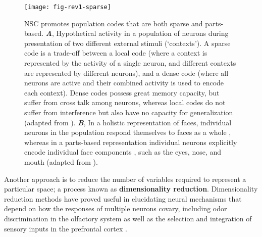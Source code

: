 \begin{figure}[h]
	\centering
	\texttt{[image: fig-rev1-sparse]}
    \caption{\Acf{NSC} promotes population codes that are both sparse and parts-based.
    \textbf{\emph{A}},
    	   Hypothetical activity in a population of neurons
           during presentation of two different external stimuli (`contexts').
           A sparse code is a trade-off between a local code
           (where a context is represented by the activity of a single neuron,
           and different contexts are represented by different neurons), and a
           dense code (where all neurons are active and their combined activity is
           used to encode each context).
           Dense codes possess great memory capacity, but suffer from cross talk
           among neurons, whereas local codes do not suffer from interference
           but also have no capacity for generalization
           (adapted from \cite{SpanneJorntell2015}).
     \textbf{\emph{B}},
           In a holistic representation of faces, 
           individual neurons in the population
           respond themselves to faces as a whole \cite{TanakaFarah1993},
           whereas in a parts-based representation
           individual neurons explicitly encode individual face components
           \cite{Palmer1977},
           such as the eyes, nose, and mouth
           (adapted from \cite{LeeSeung1999} ).}
	\label{fig:sparse-parts}
\end{figure}


Another approach is to reduce the number of
variables required to represent a particular  space;
a process known as
\textbf{dimensionality reduction}.
Dimensionality reduction methods have proved useful in elucidating neural mechanisms
that depend on how the responses of multiple neurons covary,
including odor discrimination in the olfactory system \cite{Broome2006,Koulakov2011}
as well as the selection and integration of sensory inputs 
in the prefrontal cortex \cite{Mante2013}.

